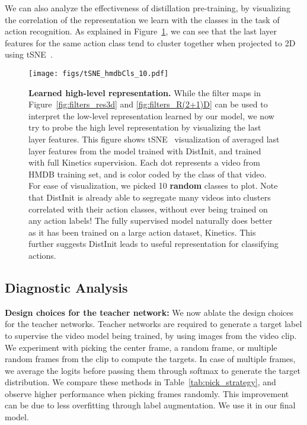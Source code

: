 \documentclass[10pt,twocolumn,letterpaper]{article}
\newcommand{\METHOD}[0]{DistInit}
\begin{document}
We can also analyze the effectiveness of distillation pre-training, by visualizing the correlation of the representation we learn with the classes in the task of action recognition. As explained
in Figure~\ref{fig:tsne}, we can see that the last layer features for the 
same action class tend to cluster together when projected to 2D using tSNE~\cite{tsne}. 

\begin{figure}
    \centering
    \texttt{[image: figs/tSNE\_hmdbCls\_10.pdf]}
    \caption{{\bf Learned high-level representation.}
    While the filter maps in  Figure~\ref{fig:filters_res3d} and \ref{fig:filters_R(2+1)D} can be used to interpret
    the low-level representation learned by our model, we now try to probe the high level representation by visualizing the 
    last layer features.
    This figure shows tSNE~\cite{tsne} visualization of averaged last layer features from the model trained with \METHOD{}, and trained
    with full Kinetics supervision. Each dot represents a video from HMDB training set, and is color coded by
    the class of that video. For ease of visualization, we picked 10 {\bf random} classes to plot.
    Note that \METHOD{} is already able to segregate many videos into clusters correlated with their action classes, without ever being trained on any action labels!
    The fully supervised model naturally does better as it has been trained on a large action dataset, Kinetics.
    This further suggests \METHOD{} leads to useful representation for classifying actions.
    }
    \label{fig:tsne}
\end{figure}



\subsection{Diagnostic Analysis}\label{sec:expt:diagnostics}

{\noindent \bf Design choices for the teacher network:}
We now ablate the design choices for the teacher networks. Teacher networks are required to generate a target label to
supervise the video model being trained, by using images from the video clip. We experiment with picking the center frame, a random frame, or multiple random frames from the clip to compute the targets. In case of multiple frames, we average the logits before
passing them through softmax to generate the target distribution. We compare these methods in Table~\ref{tab:pick_strategy},
and observe higher performance when picking frames randomly. This improvement 
can be due
to less overfitting through label augmentation. We use it in our final model.
\end{document}
